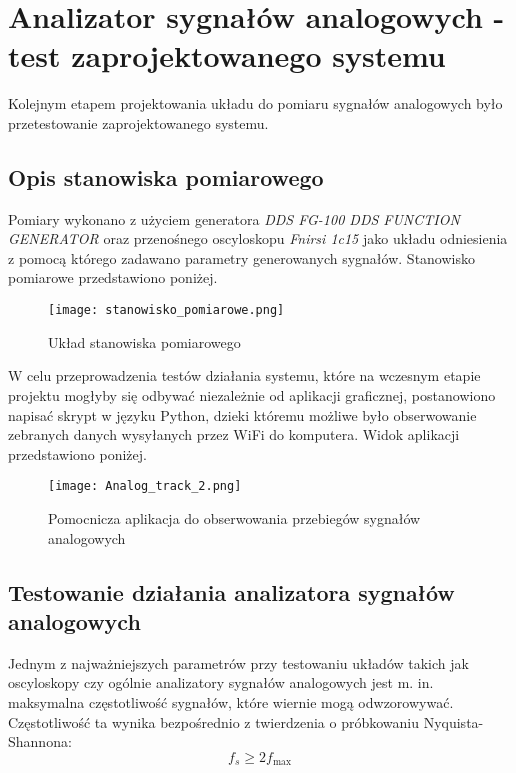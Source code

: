 \section{Analizator sygnałów analogowych - test zaprojektowanego systemu}
    Kolejnym etapem projektowania układu do pomiaru sygnałów analogowych było przetestowanie 
    zaprojektowanego systemu.

\subsection{Opis stanowiska pomiarowego}
    Pomiary wykonano z użyciem generatora \textit{DDS FG-100 DDS FUNCTION GENERATOR}
    oraz przenośnego oscyloskopu \textit{Fnirsi 1c15} jako układu odniesienia z pomocą którego
    zadawano parametry generowanych sygnałów. Stanowisko pomiarowe przedstawiono poniżej.

    \begin{figure}[!ht]
        \centering
        \texttt{[image: stanowisko\_pomiarowe.png]}
        \caption{Układ stanowiska pomiarowego}
        \label{fig:stanowisko_pomiarowe}
    \end{figure} 

    W celu przeprowadzenia testów działania systemu, które na wczesnym etapie projektu
    mogłyby się odbywać niezależnie od aplikacji graficznej, postanowiono napisać
    skrypt w języku Python, dzieki któremu możliwe było obserwowanie zebranych danych
    wysyłanych przez WiFi do komputera. Widok aplikacji przedstawiono poniżej.
    
    \begin{figure}[H]
        \centering
        \texttt{[image: Analog\_track\_2.png]}
        \caption{Pomocnicza aplikacja do obserwowania przebiegów sygnałów analogowych}
        \label{fig:Analog_track_2}
    \end{figure}

\subsection{Testowanie działania analizatora sygnałów analogowych}
    Jednym z najważniejszych parametrów przy testowaniu układów takich jak oscyloskopy
    czy ogólnie analizatory sygnałów analogowych jest m. in. maksymalna częstotliwość
    sygnałów, które wiernie mogą odwzorowywać. Częstotliwość ta wynika bezpośrednio z 
    twierdzenia o próbkowaniu Nyquista-Shannona:
    \begin{equation*}
        f_s \geq 2 f_{\max}
    \end{equation*}

